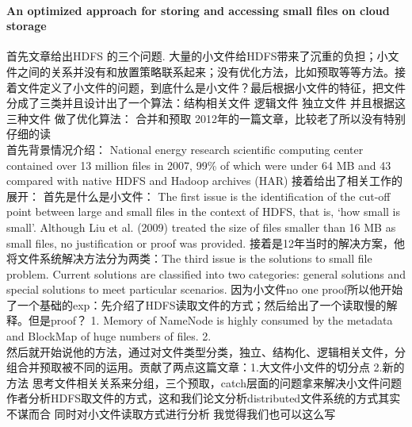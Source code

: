 \documentclass[8pt,UTF8]{article}
\begin{document}
            \paragraph{An optimized approach for storing and accessing small files on cloud storage}
                首先文章给出HDFS 的三个问题. 大量的小文件给HDFS带来了沉重的负担；小文件之间的关系并没有和放置策略联系起来；没有优化方法，比如预取等等方法。接着文件定义了小文件的问题，到底什么是小文件？最后根据小文件的特征，把文件分成了三类并且设计出了一个算法：结构相关文件 逻辑文件 独立文件 并且根据这三种文件 做了优化算法： 合并和预取 2012年的一篇文章，比较老了所以没有特别仔细的读 \\
                首先背景情况介绍： National energy research scientific computing center contained over 13 million files in 2007, 99\% of which were under 64 MB and 43%
                compared with native HDFS and Hadoop archives (HAR) 接着给出了相关工作的展开： 首先是什么是小文件： The first issue is the identification of the cut-off point between large and small files in the context of HDFS, that is, ‘how small is small’. Although Liu et al. (2009) treated the size of files smaller than 16 MB as small files, no justification or proof was provided. 接着是12年当时的解决方案，他将文件系统解决方法分为两类：The third issue is the solutions to small file problem. Current solutions are classified into two categories: general solutions and special solutions to meet particular scenarios.
                因为小文件no one proof所以他开始了一个基础的exp：先介绍了HDFS读取文件的方式；然后给出了一个读取慢的解释。但是proof？ 1.	Memory of NameNode is highly consumed by the metadata and BlockMap of huge numbers of files.
                2. \\ 然后就开始说他的方法，通过对文件类型分类，独立、结构化、逻辑相关文件，分组合并预取被不同的运用。贡献了两点这篇文章：1.大文件小文件的切分点 2.新的方法 思考文件相关关系来分组，三个预取，catch层面的问题拿来解决小文件问题
                作者分析HDFS取文件的方式，这和我们论文分析distributed文件系统的方式其实不谋而合 同时对小文件读取方式进行分析 我觉得我们也可以这么写
\end{document}
